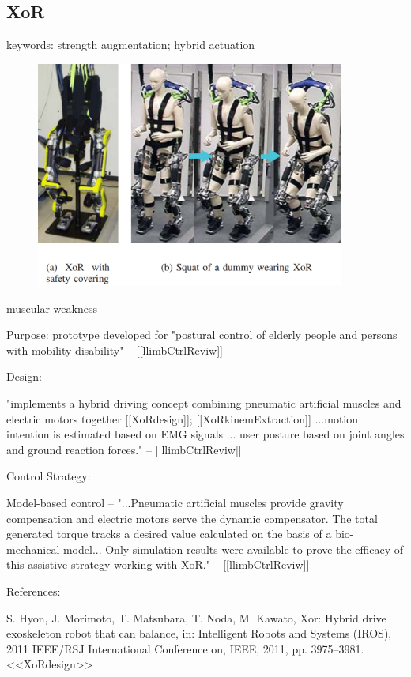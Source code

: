 \subsection{XoR}
\label{exo:XoR}

keywords: strength augmentation; hybrid actuation\\

\begin{figure}[ht]
  \centering
  \includegraphics[width=4.0in]{exos/figs/xor.png}
\end{figure}


muscular weakness

Purpose: prototype developed for "postural control of elderly people and persons with mobility disability" -- [[llimbCtrlReviw]]


Design:

"implements a hybrid driving concept combining pneumatic artificial muscles and electric motors together [[XoRdesign]]; [[XoRkinemExtraction]] ...motion intention is estimated based on EMG signals ... user posture based on joint angles and ground reaction forces."  -- [[llimbCtrlReviw]]


Control Strategy:

Model-based control -- "...Pneumatic artificial muscles provide gravity compensation and electric motors serve the dynamic compensator. The total generated torque tracks a desired value calculated on the basis of a bio-mechanical model... Only simulation results were available to prove the efficacy of this assistive strategy working with XoR." -- [[llimbCtrlReviw]]


References:

S. Hyon, J. Morimoto, T. Matsubara, T. Noda, M. Kawato, Xor: Hybrid drive exoskeleton robot that can balance, in: Intelligent Robots and Systems (IROS), 2011 IEEE/RSJ International Conference on, IEEE, 2011, pp. 3975–3981. <<XoRdesign>>

